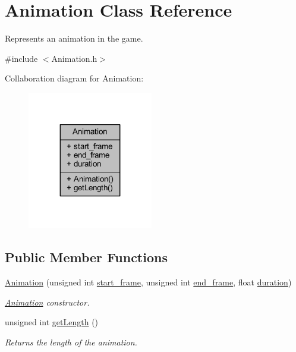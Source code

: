 \hypertarget{class_animation}{\section{Animation Class Reference}
\label{class_animation}
}


Represents an animation in the game.  




{\ttfamily \#include $<$Animation.\+h$>$}



Collaboration diagram for Animation\+:
\nopagebreak
\begin{figure}[H]
\begin{center}
\leavevmode
\includegraphics[width=155pt]{class_animation__coll__graph}
\end{center}
\end{figure}
\subsection*{Public Member Functions}
\begin{DoxyCompactItemize}
\item 
\hyperlink{class_animation_a35f74d462e717b7f65917a5259183db8}{Animation} (unsigned int \hyperlink{class_animation_a22f5936a58ca1850d5232a1cbfcb3426}{start\+\_\+frame}, unsigned int \hyperlink{class_animation_a4dcf93e9ee175acaa8cc84f3241e8ee0}{end\+\_\+frame}, float \hyperlink{class_animation_a66cc7333638f071b0401072ba95c55fd}{duration})
\begin{DoxyCompactList}\small\item\em \hyperlink{class_animation}{Animation} constructor. \end{DoxyCompactList}\item 
unsigned int \hyperlink{class_animation_ad0967bfc76be3a06a17ad774b50dc97e}{get\+Length} ()
\begin{DoxyCompactList}\small\item\em Returns the length of the animation. \end{DoxyCompactList}\end{DoxyCompactItemize}
